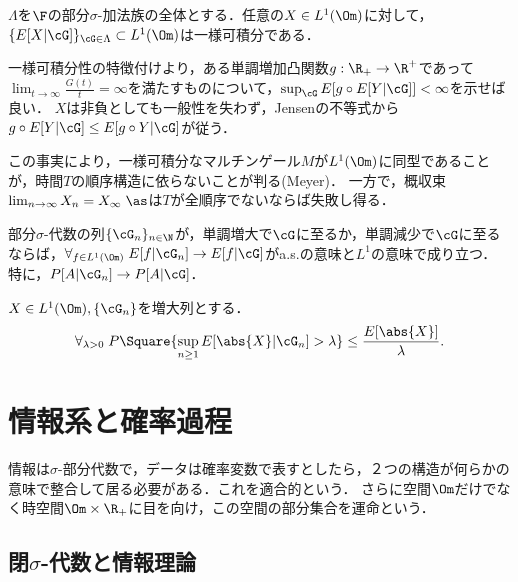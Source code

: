 \documentclass[uplatex,dvipdfmx]{jsreport}
\begin{document}
\begin{theorem}
    $\Lambda$を$\F$の部分$\sigma$-加法族の全体とする．任意の$X\in L^1(\Om)$に対して，$\{E[X|\cG]\}_{\cG\in\Lambda}\subset L^1(\Om)$は一様可積分である．
\end{theorem}
\begin{Proof}
    一様可積分性の特徴付けより，ある単調増加凸関数$g:\R_+\to\R^+$であって$\lim_{t\to\infty}\frac{G(t)}{t}=\infty$を満たすものについて，$\sup_{\cG}E[g\circ E[Y|\cG]]<\infty$を示せば良い．
    $X$は非負としても一般性を失わず，Jensenの不等式から$g\circ E[Y|\cG]\le E[g\circ Y|\cG]$が従う．
\end{Proof}
\begin{remarks}
    この事実により，一様可積分なマルチンゲール$M$が$L^1(\Om)$に同型であることが，時間$T$の順序構造に依らないことが判る(Meyer\cite{Meyer})．
    一方で，概収束$\lim_{n\to\infty}X_n=X_\infty\;\as$は$T$が全順序でないならば失敗し得る．
\end{remarks}

\begin{corollary}[連続性]
    部分$\sigma$-代数の列$\{\cG_n\}_{n\in\N}$が，単調増大で$\cG$に至るか，単調減少で$\cG$に至るならば，$\forall_{f\in L^1(\Om)}\;E[f|\cG_n]\to E[f|\cG]$がa.s.の意味と$L^1$の意味で成り立つ．
    特に，$P[A|\cG_n]\to P[A|\cG]$．
\end{corollary}

\begin{theorem}[最大不等式]
    $X\in L^1(\Om),\{\cG_n\}$を増大列とする．
    \[\forall_{\lambda>0}\;P\Square{\sup_{n\ge 1}E[\abs{X}|\cG_n]>\lambda}\le\frac{E[\abs{X}]}{\lambda}.\]
\end{theorem}


\section{情報系と確率過程}

\begin{tcolorbox}[colframe=ForestGreen, colback=ForestGreen!10!white,breakable,colbacktitle=ForestGreen!40!white,coltitle=black,fonttitle=\bfseries\sffamily,
title=]
    情報は$\sigma$-部分代数で，データは確率変数で表すとしたら，２つの構造が何らかの意味で整合して居る必要がある．これを適合的という．
    さらに空間$\Om$だけでなく時空間$\Om\times\R_+$に目を向け，この空間の部分集合を運命という．
\end{tcolorbox}

\subsection{閉$\sigma$-代数と情報理論}
\end{document}
